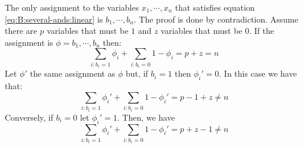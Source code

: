 \hfill

The only assignment to the variables $x_1,\cdots,x_n$ that satisfies equation
\ref{eq:B:several-ands:linear} is $b_1,\cdots,b_n$. The proof is done by contradiction.
Assume there are $p$ variables that must be $1$ and $z$ variables that must be $0$.
If the assignment is $\phi=b_1,\cdots,b_n$ then:
\[
\sum_{i : b_i=1} \phi_i + \sum_{i : b_i=0} 1 - \phi_i = p + z = n
\]
Let $\phi'$ the same assignment as $\phi$ but, if $b_i=1$ then $\phi_i'=0$.
In this case we have that:
\[
\sum_{i : b_i=1} \phi_i' + \sum_{i : b_i=0} 1 - \phi_i' = p - 1 + z \neq n
\]
Conversely, if $b_i=0$ let $\phi_i'=1$. Then, we have
\[
\sum_{i : b_i=1} \phi_i' + \sum_{i : b_i=0} 1 - \phi_i' = p + z - 1 \neq n
\]


